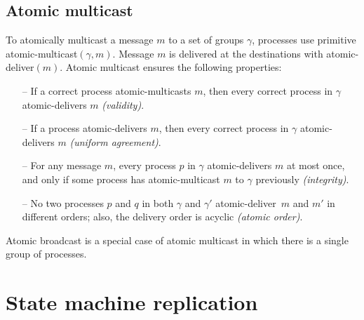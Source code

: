 \documentclass[11pt]{article}
\newcommand{\amcast}{atomic-multicast}
\newcommand{\amdel}{atomic-deliver}
\begin{document}
\subsection{Atomic multicast}
\label{sec:amcast}

To atomically multicast a message $m$ to a set of groups $\gamma$, processes use primitive \amcast$(\gamma, m)$.
Message $m$ is delivered at the destinations with \amdel$(m)$.
Atomic multicast ensures the following properties:

\begin{itemize}

    \item[--] If a correct process \amcast{}s $m$, then every correct process in $\gamma$ \amdel{}s $m$ \emph{(validity)}.

    \item[--] If a process \amdel{}s $m$, then every correct process in $\gamma$ \amdel{}s $m$ \emph{(uniform agreement)}.

    \item[--] For any message $m$, every process $p$ in $\gamma$ \amdel{}s $m$ at most once, and only if some process has \amcast{} $m$ to $\gamma$ previously \emph{(integrity)}.

    \item[--] No two processes $p$ and $q$ in both $\gamma$ and $\gamma'$ \amdel\ $m$ and $m'$ in different orders; also, the delivery order is acyclic \emph{(atomic order)}.

\end{itemize}

Atomic broadcast is a special case of atomic multicast in which there is a single group of processes.


%



\section{State machine replication}
\label{sec:smr}
\end{document}
